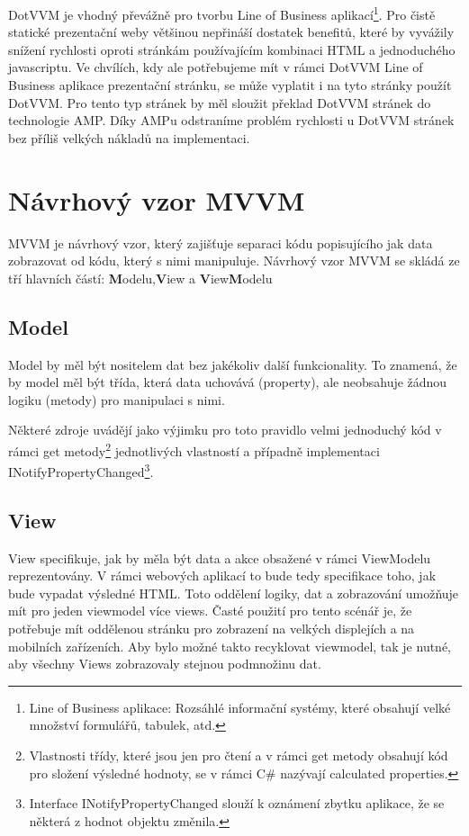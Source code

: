 DotVVM je vhodný převážně pro tvorbu Line of Business aplikací\footnote{Line of Business aplikace: Rozsáhlé informační systémy, které obsahují velké množství formulářů, tabulek, atd.}\cite{DotVVMIntro}. Pro čistě statické prezentační weby většinou nepřináší dostatek benefitů, které by vyvážily snížení rychlosti oproti stránkám používajícím kombinaci HTML a jednoduchého javascriptu. Ve chvílích, kdy ale potřebujeme mít v rámci DotVVM Line of Business aplikace prezentační stránku, se může vyplatit i na tyto stránky použít DotVVM. Pro tento typ stránek by měl sloužit překlad DotVVM stránek do technologie AMP. Díky AMPu odstraníme problém rychlosti u DotVVM stránek bez příliš velkých nákladů na implementaci.

\section{Návrhový vzor MVVM}
MVVM je návrhový vzor, který zajišťuje separaci kódu popisujícího jak data zobrazovat od kódu, který s nimi manipuluje. Návrhový vzor MVVM se skládá ze tří hlavních částí: \textbf{M}odelu,\textbf{V}iew a \textbf{V}iew\textbf{M}odelu

\subsection*{Model}
Model by měl být nositelem dat bez jakékoliv další funkcionality. To znamená, že by model měl být třída, která data uchovává (property), ale neobsahuje žádnou logiku (metody) pro manipulaci s nimi.

Některé zdroje uvádějí jako výjimku pro toto pravidlo velmi jednoduchý kód v rámci get metody\footnote{Vlastnosti třídy, které jsou jen pro čtení a v rámci get metody obsahují kód pro složení výsledné hodnoty, se v rámci C# nazývají calculated properties.} jednotlivých vlastností a případně implementaci INotifyPropertyChanged\footnote{Interface INotifyPropertyChanged slouží k oznámení zbytku aplikace, že se některá z hodnot objektu změnila.}.

\subsection*{View}
View specifikuje, jak by měla být data a akce obsažené v rámci ViewModelu reprezentovány. V rámci webových aplikací to bude tedy specifikace toho, jak bude vypadat výsledné HTML. Toto oddělení logiky, dat a zobrazování umožňuje mít pro jeden viewmodel více views. Časté použití pro tento scénář je, že potřebuje mít oddělenou stránku pro zobrazení na velkých displejích a na mobilních zařízeních. Aby bylo možné takto recyklovat viewmodel, tak je nutné, aby všechny Views zobrazovaly stejnou podmnožinu dat.
